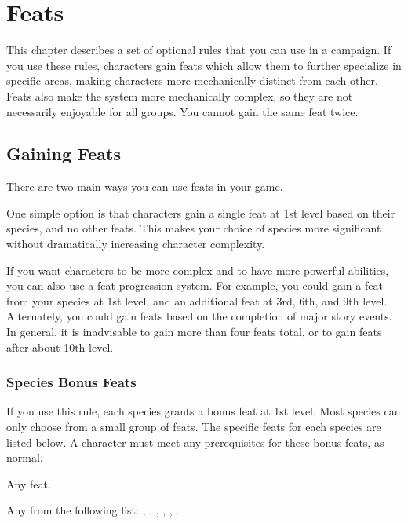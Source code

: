 \chapter{Feats}\label{Feats}

This chapter describes a set of optional rules that you can use in a campaign.
If you use these rules, characters gain feats which allow them to further specialize in specific areas, making characters more mechanically distinct from each other.
Feats also make the system more mechanically complex, so they are not necessarily enjoyable for all groups.
You cannot gain the same feat twice.

\section{Gaining Feats}
    There are two main ways you can use feats in your game.

    One simple option is that characters gain a single feat at 1st level based on their species, and no other feats.
    This makes your choice of species more significant without dramatically increasing character complexity.

    If you want characters to be more complex and to have more powerful abilities, you can also use a feat progression system.
    For example, you could gain a feat from your species at 1st level, and an additional feat at 3rd, 6th, and 9th level.
    Alternately, you could gain feats based on the completion of major story events.
    In general, it is inadvisable to gain more than four feats total, or to gain feats after about 10th level.

    \subsection{Species Bonus Feats}\label{Species Bonus Feats}
        If you use this rule, each species grants a bonus feat at 1st level.
        Most species can only choose from a small group of feats.
        The specific feats for each species are listed below.
        A character must meet any prerequisites for these bonus feats, as normal.

         Any feat.

         Any from the following list: , , , , , .

